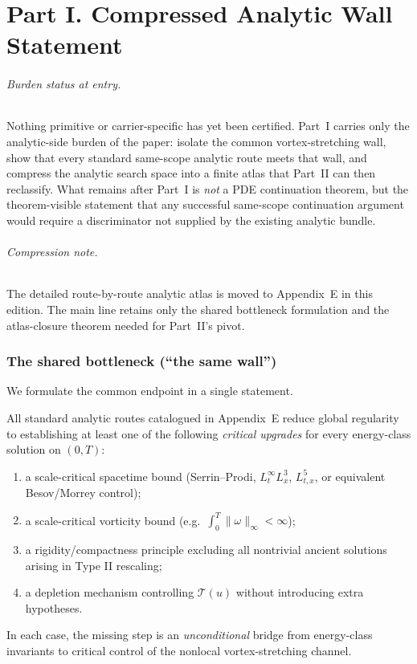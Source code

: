 \part*{Part I. Compressed Analytic Wall Statement}

\paragraph{Burden status at entry.}
Nothing primitive or carrier-specific has yet been certified. Part~I carries only the analytic-side burden of the paper: isolate the common vortex-stretching wall, show that every standard same-scope analytic route meets that wall, and compress the analytic search space into a finite atlas that Part~II can then reclassify. What remains after Part~I is \emph{not} a PDE continuation theorem, but the theorem-visible statement that any successful same-scope continuation argument would require a discriminator not supplied by the existing analytic bundle.

\paragraph{Compression note.}
The detailed route-by-route analytic atlas is moved to Appendix~E in this edition.
The main line retains only the shared bottleneck formulation and the atlas-closure theorem needed for
Part~II's pivot.

\section{The shared bottleneck (``the same wall'')}
We formulate the common endpoint in a single statement.

\begin{proposition}\label{prop:common-bottleneck}
All standard analytic routes catalogued in Appendix~E reduce global regularity to establishing at least one of the following
\emph{critical upgrades} for every energy-class solution on $(0,T)$:
\begin{enumerate}[label=(\alph*)]
\item a scale-critical spacetime bound (Serrin--Prodi, $L^\infty_t L^3_x$, $L^5_{t,x}$, or equivalent Besov/Morrey control);
\item a scale-critical vorticity bound (e.g.\ $\int_0^T \|\omega\|_\infty<\infty$);
\item a rigidity/compactness principle excluding all nontrivial ancient solutions arising in Type II rescaling;
\item a depletion mechanism controlling $\mathcal T(u)$ without introducing extra hypotheses.
\end{enumerate}
In each case, the missing step is an \emph{unconditional} bridge from energy-class invariants to
critical control of the nonlocal vortex-stretching channel.
\end{proposition}

